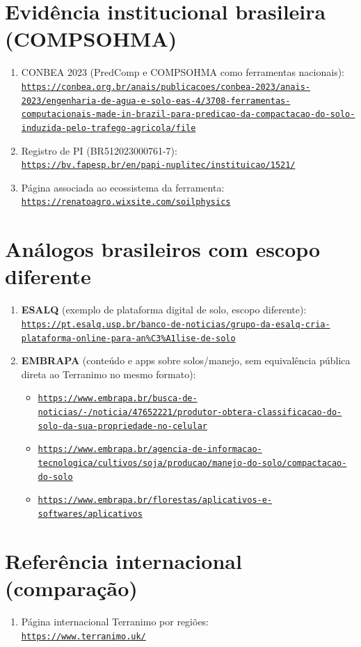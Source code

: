 \documentclass[12pt,a4paper]{article}
\newcommand{\Section}[1]{\needspace{12\baselineskip}\section{#1}}
\newcommand{\Link}[1]{\href{#1}{\nolinkurl{#1}}}
\newenvironment{NoBreakEnumerate}
{\begin{samepage}\begin{enumerate}}
{\end{enumerate}\end{samepage}}
\newenvironment{NoBreakItemize}
{\begin{samepage}\begin{itemize}}
{\end{itemize}\end{samepage}}
\begin{document}
\Section{Evidência institucional brasileira (COMPSOHMA)}
\begin{NoBreakEnumerate}
  \item CONBEA 2023 (PredComp e COMPSOHMA como ferramentas nacionais):\\
  \Link{https://conbea.org.br/anais/publicacoes/conbea-2023/anais-2023/engenharia-de-agua-e-solo-eas-4/3708-ferramentas-computacionais-made-in-brazil-para-predicao-da-compactacao-do-solo-induzida-pelo-trafego-agricola/file}

  \item Registro de PI (BR512023000761-7):\\
  \Link{https://bv.fapesp.br/en/papi-nuplitec/instituicao/1521/}

  \item Página associada ao ecossistema da ferramenta:\\
  \Link{https://renatoagro.wixsite.com/soilphysics}
\end{NoBreakEnumerate}

\Section{Análogos brasileiros com escopo diferente}
\begin{NoBreakEnumerate}
  \item \textbf{ESALQ} (exemplo de plataforma digital de solo, escopo diferente):\\
  \Link{https://pt.esalq.usp.br/banco-de-noticias/grupo-da-esalq-cria-plataforma-online-para-an\%C3\%A1lise-de-solo}

  \item \textbf{EMBRAPA} (conteúdo e apps sobre solos/manejo, sem equivalência pública direta ao Terranimo no mesmo formato):
  \begin{NoBreakItemize}
    \item \Link{https://www.embrapa.br/busca-de-noticias/-/noticia/47652221/produtor-obtera-classificacao-do-solo-da-sua-propriedade-no-celular}
    \item \Link{https://www.embrapa.br/agencia-de-informacao-tecnologica/cultivos/soja/producao/manejo-do-solo/compactacao-do-solo}
    \item \Link{https://www.embrapa.br/florestas/aplicativos-e-softwares/aplicativos}
  \end{NoBreakItemize}
\end{NoBreakEnumerate}

\Section{Referência internacional (comparação)}
\begin{NoBreakEnumerate}
  \item Página internacional Terranimo por regiões:\\
  \Link{https://www.terranimo.uk/}
\end{NoBreakEnumerate}
\end{document}
